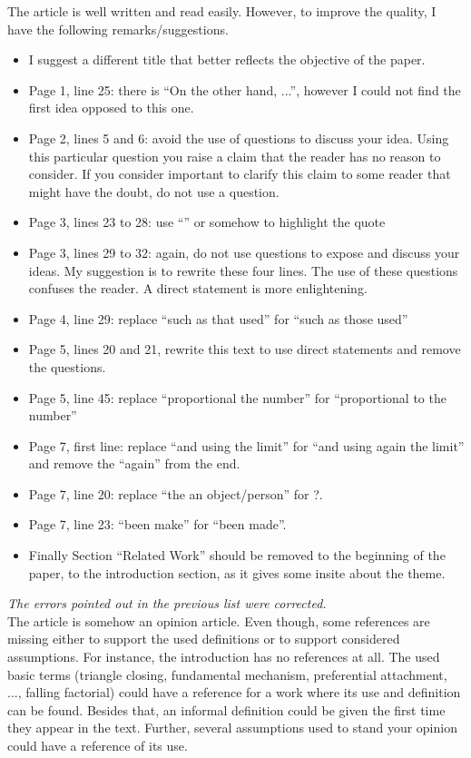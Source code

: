 \documentclass{article}
\begin{document}
The article is well written and read easily. However, to improve the
quality, I have the following remarks/suggestions. 

\begin{itemize}
\item I suggest a different title that better reflects the objective of the paper.
\item Page 1, line 25: there is ``On the other hand, ...'', however I could not find the first idea opposed to this one.
\item Page 2, lines 5 and 6: avoid the use of questions to discuss your idea. Using this particular question you raise a claim that the reader has no reason to consider. If you consider important to clarify this claim to some reader that might have the doubt, do not use a question.
\item Page 3, lines 23 to 28: use ``'' or somehow to highlight the quote
\item Page 3, lines 29 to 32: again, do not use questions to expose and discuss your ideas. My suggestion is to rewrite these four lines. The use of these questions confuses the reader. A direct statement is more enlightening.
\item Page 4, line 29: replace ``such as that used'' for ``such as those used''
\item Page 5, lines 20 and 21, rewrite this text to use direct statements and remove the questions.
\item Page 5, line 45: replace ``proportional the number'' for ``proportional to the number''
\item Page 7, first line: replace ``and using the limit'' for ``and using again the limit'' and remove the ``again'' from the end.
\item Page 7, line 20: replace ``the an object/person'' for ?.
\item Page 7, line 23: ``been make'' for ``been made''.
\item Finally Section ``Related Work'' should be removed to the beginning
  of the paper, to the introduction section, as it gives some insite
  about the theme.
\end{itemize}
\textit{ The errors pointed out in the previous list were corrected. } \\

The article is somehow an opinion article.
Even though, some references are missing either to support the used definitions or to support considered assumptions.
For instance, the introduction has no references at all. The used basic
terms (triangle closing, fundamental mechanism, preferential attachment,
..., falling factorial) could have a reference for a work where its use
and definition can be found. 
Besides that, an informal definition could be given the first time they
appear in the text. Further, several assumptions used to stand your
opinion could have a reference of its use. 
\end{document}
